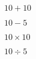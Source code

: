 \documentclass[11pt, a4paper, oneside]{article}
\begin{document}
	
	$ 10 + 10 $
	
	$ 10 - 5 $
	
	$ 10 \times 10 $
	
	$ 10 \div 5 $
	
\end{document}
